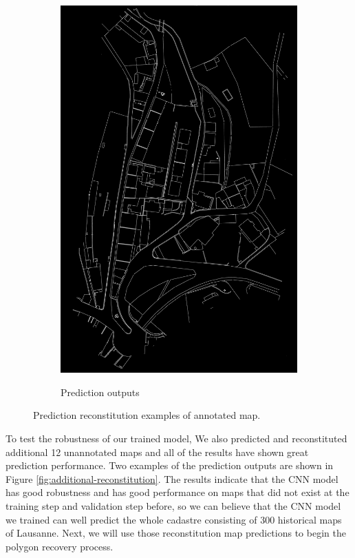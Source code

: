 \documentclass[12pt]{article}
\begin{document}
\begin{figure}[H]
\begin{subfigure}[b]{.32\textwidth}
		\includegraphics[width=1\linewidth]{images/original_prediction2.png}  
		\label{fig:original-pre}
		\caption{Prediction outputs}
	\end{subfigure}
	
	\caption{Prediction reconstitution examples of annotated map.}
	\label{fig:original-reconstitution}
\end{figure}


To test the robustness of our trained model, We also predicted and reconstituted additional 12 unannotated maps and all of the results have shown great prediction performance. Two examples of the prediction outputs are shown in Figure \ref{fig:additional-reconstitution}. The results indicate that the CNN model has good robustness and has good performance on maps that did not exist at the training step and validation step before, so we can believe that the CNN model we trained can well predict the whole cadastre consisting of 300 historical maps of Lausanne. Next, we will use those reconstitution map predictions to begin the polygon recovery process.
\end{document}
